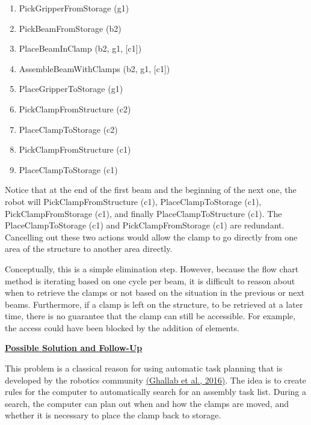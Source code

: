 \documentclass[11pt]{book}
\begin{document}
\begin{enumerate}
\begin{enumerate}
	\item {\footnotesize PickGripperFromStorage (g1)}

	\item {\footnotesize PickBeamFromStorage (b2)}

	\item {\footnotesize PlaceBeamInClamp (b2, g1, [c1])}

	\item {\footnotesize AssembleBeamWithClamps (b2, g1, [c1])}

	\item {\footnotesize PlaceGripperToStorage (g1)}

	\item {\footnotesize PickClampFromStructure (c2)}

	\item {\footnotesize PlaceClampToStorage (c2)}

	\item {\footnotesize PickClampFromStructure (c1)}

	\item {\footnotesize PlaceClampToStorage (c1)}

\end{enumerate}
\end{enumerate}
Notice that at the end of the first beam and the beginning of the next one, the robot will PickClampFromStructure (c1), PlaceClampToStorage (c1), PickClampFromStorage (c1), and finally PlaceClampToStructure (c1). The PlaceClampToStorage (c1) and PickClampFromStorage (c1) are redundant. Cancelling out these two actions would allow the clamp to go directly from one area of the structure to another area directly.

Conceptually, this is a simple elimination step. However, because the flow chart method is iterating based on one cycle per beam, it is difficult to reason about when to retrieve the clamps or not based on the situation in the previous or next beams. Furthermore, if a clamp is left on the structure, to be retrieved at a later time, there is no guarantee that the clamp can still be accessible. For example, the access could have been blocked by the addition of elements. 

\textbf{\uline{Possible Solution and Follow-Up}}

This problem is a classical reason for using automatic task planning that is developed by the robotics community \href{https://www.zotero.org/google-docs/?DFFCVl}{(Ghallab et al., 2016)}. The idea is to create rules for the computer to automatically search for an assembly task list. During a search, the computer can plan out when and how the clamps are moved, and whether it is necessary to place the clamp back to storage. 
\end{document}
